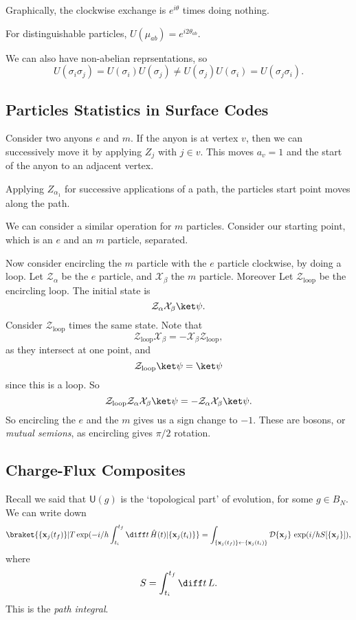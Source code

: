 \documentclass[12pt]{article}
\begin{document}
Graphically, the clockwise exchange is $e^{i\theta}$ times doing nothing.

For distinguishable particles, $U(\mu_{ab}) = e^{i 2\theta_{ab}}$.

We can also have non-abelian reprsentations, so
\[
U(\sigma_i \sigma_j) = U(\sigma_i) U(\sigma_j) \neq U(\sigma_j) U(\sigma_i) = U(\sigma_j \sigma_i).
\]


\subsection{Particles Statistics in Surface Codes}%
\label{sub:pssc}

Consider two anyons $e$ and $m$. If the anyon is at vertex $v$, then we can successively move it by applying $Z_j$ with $j \in v$. This moves $a_v = 1$ and the start of the anyon to an adjacent vertex.

Applying $Z_{\alpha_1}$ for successive applications of a path, the particles start point moves along the path.

We can consider a similar operation for $m$ particles. Consider our starting point, which is an $e$ and an $m$ particle, separated.

Now consider encircling the $m$ particle with the $e$ particle clockwise, by doing a loop. Let $\mathcal{Z}_{\alpha}$ be the $e$ particle, and $\mathcal{X}_{\beta}$ the $m$ particle. Moreover Let $\mathcal{Z}_{\mathrm{loop}}$ be the encircling loop. The initial state is
\[
\mathcal{Z}_{\alpha} \mathcal{X}_{\beta} \ket \psi.
\]
Consider $\mathcal{Z}_{\mathrm{loop}}$ times the same state. Note that
\[
\mathcal{Z}_{\mathrm{loop}} \mathcal{X}_\beta = - \mathcal{X}_\beta \mathcal{Z}_{\mathrm{loop}},
\]
as they intersect at one point, and
\[
\mathcal{Z}_{\mathrm{loop}} \ket \psi = \ket \psi
\]
since this is a loop. So
\[
\mathcal{Z}_{\mathrm{loop}} \mathcal{Z}_\alpha \mathcal{X}_\beta \ket \psi = - \mathcal{Z}_\alpha \mathcal{X}_\beta \ket \psi.
\]
So encircling the $e$ and the $m$ gives us a sign change to $-1$. These are bosons, or \emph{mutual semions}, as encircling gives $\pi/2$ rotation.

\subsection{Charge-Flux Composites}%
\label{sub:cfc}

Recall we said that $\mathsf{U}(g)$ is the `topological part' of evolution, for some $g \in B_N$. We can write down
\begin{align*}
	\braket{\{\mathbf{x}_j(t_f)\} | T \exp( - i/h \int_{t_i}^{t_f} \diff t\, \hat H(t) | \{\mathbf{x}_j(t_i)\} } = \int_{\{\mathbf{x}_j(t_f)\} \leftarrow \{\mathbf{x}_j(t_i)\}} \mathcal{D}\{\mathbf{x}_j\} \, \exp(i/h S[\{\mathbf{x}_j\}]),
\end{align*}
where
\[
S = \int_{t_i}^{t_f} \diff t\, L.
\]
This is the \emph{path integral}.
\end{document}
